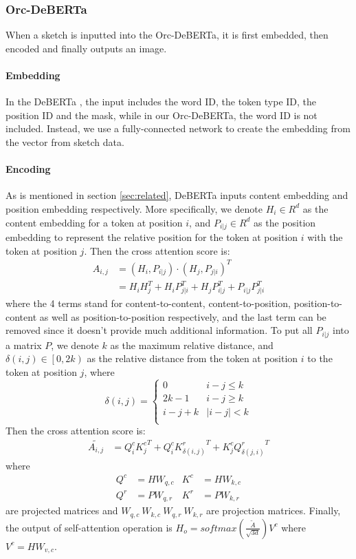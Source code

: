 \documentclass{article}
\begin{document}
\subsubsection{Orc-DeBERTa}

When a sketch is inputted into the Orc-DeBERTa, it is first embedded, then encoded and finally outputs an image.

\paragraph{Embedding}
In the DeBERTa \citep{Package}, the input includes the word ID,  the token type ID, the position ID and the mask, while in our Orc-DeBERTa, the word ID is not included. Instead, we use a fully-connected network to create the embedding from the vector from sketch data.

\paragraph{Encoding}
As is mentioned in section \ref{sec:related}, DeBERTa inputs content embedding and position embedding respectively.
More specifically, we denote $ H_i \in R^d $ as the content embedding for a token at position $ i $, and $ P_{i|j} \in R^d  $ as the position embedding to represent the relative position for the token at position $ i $ with the token at position $ j $. 
Then the cross attention score is:
\begin{align*}
	A_{i,j} 
	&= (H_i, P_{i|j}) \cdot (H_j, P_{j|i})^T \\
	&= H_i H_j^T + H_i P_{j|i}^T 
	+ H_j P_{i|j}^T + P_{i|j} P_{j|i}^T
\end{align*}
where the 4 terms stand for content-to-content, content-to-position, position-to-content as well as position-to-position respectively, and the last term can be removed since it doesn't provide much additional information.
To put all $ P_{i|j} $ into a matrix $ P $, we denote $ k $ as the maximum relative distance, and $ \delta (i,j) \in \left[ 0, 2k \right) $ as the relative distance from the token at position $ i $ to the token at position $ j $, where
\begin{equation*}
	\delta (i,j) = 
	\left\{
	\begin{array}{ll}
		0 & i - j \leq k\\
		2k-1 & i - j \geq k \\
		i-j+k & |i - j| < k \\
	\end{array}
	\right.
\end{equation*}
Then the cross attention score is:
\begin{align*}
	\tilde{A_{i,j}}
	&= Q^c_i {K^c_j}^T 
	+ Q^c_i {K^r_{\delta (i,j)}}^T 
	+ K^c_j {Q^r_{\delta (j,i)}}^T
\end{align*}
where
\begin{align*}
	Q^c &= H W_{q,c} & K^c &= H W_{k,c} \\
	Q^r &= P W_{q,r} & K^r &= P W_{k,r} 
\end{align*}
are projected matrices and $ W_{q,c} \ W_{k,c} \ W_{q,r} \ W_{k,r}$ are projection matrices.
Finally, the output of self-attention operation is
$ H_o = softmax(\frac{\tilde{A}}{\sqrt{3d}}) V^c $
where $ V^c = H W_{v,c} $.
\end{document}
